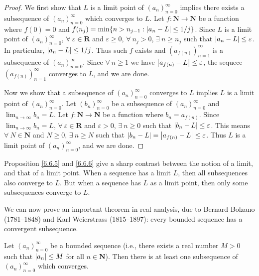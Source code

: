 \begin{proof}
We first show that \(L\) is a limit point of \((a_n)_{n = 0}^\infty\) implies there exists a subsequence of \((a_n)_{n = 0}^\infty\) which converges to \(L\).
Let \(f : \mathbf{N} \to \mathbf{N}\) be a function where \(f(0) = 0\) and \(f(n_j) = \min\{n > n_{j - 1} : \abs*{a_n - L} \leq 1 / j\}\).
Since \(L\) is a limit point of \((a_n)_{n = 0}^\infty\), \(\forall\ \varepsilon \in \mathbf{R}\) and \(\varepsilon \geq 0\), \(\forall\ n_j > 0\), \(\exists\ n \geq n_j\) such that \(\abs*{a_n - L} \leq \varepsilon\).
In particular, \(\abs*{a_n - L} \leq 1 / j\).
Thus such \(f\) exists and \((a_{f(n)})_{n = 1}^\infty\) is a subsequence of \((a_n)_{n = 0}^\infty\).
Since \(\forall\ n \geq 1\) we have \(\abs*{a_{f(n)} - L} \leq \varepsilon\), the sequece \((a_{f(n)})_{n = 1}^\infty\) converges to \(L\), and we are done.

Now we show that a subsequence of \((a_n)_{n = 0}^\infty\) converges to \(L\) implies \(L\) is a limit point of \((a_n)_{n = 0}^\infty\).
Let \((b_n)_{n = 0}^\infty\) be a subsequence of \((a_n)_{n = 0}^\infty\) and \(\lim_{n \to \infty} b_n = L\).
Let \(f : \mathbf{N} \to \mathbf{N}\) be a function where \(b_n = a_{f(n)}\).
Since \(\lim_{n \to \infty} b_n = L\), \(\forall\ \varepsilon \in \mathbf{R}\) and \(\varepsilon > 0\), \(\exists\ n \geq 0\) such that \(\abs*{b_n - L} \leq \varepsilon\).
This means \(\forall\ N \in \mathbf{N}\) and \(N \geq 0\), \(\exists\ n \geq N\) such that \(\abs*{b_n - L} = \abs*{a_{f(n)} - L} \leq \varepsilon\).
Thus \(L\) is a limit point of \((a_n)_{n = 0}^\infty\), and we are done.
\end{proof}

\begin{remark}\label{6.6.7}
Proposition \ref{6.6.5} and \ref{6.6.6} give a sharp contrast between the notion of a limit, and that of a limit point.
When a sequence has a limit \(L\), then all subsequences also converge to \(L\).
But when a sequence has \(L\) as a limit point, then only some subsequences converge to \(L\).
\end{remark}

\begin{note}
We can now prove an important theorem in real analysis, due to Bernard Bolzano (1781--1848) and Karl Weierstrass (1815--1897):
every bounded sequence has a convergent subsequence.
\end{note}

\begin{theorem}\label{6.6.8}
Let \((a_n)_{n = 0}^\infty\) be a bounded sequence
(i.e., there exists a real number \(M > 0\) such that \(\abs*{a_n} \leq M\) for all \(n \in \mathbf{N}\)).
Then there is at least one subsequence of \((a_n)_{n = 0}^\infty\) which converges.
\end{theorem}

